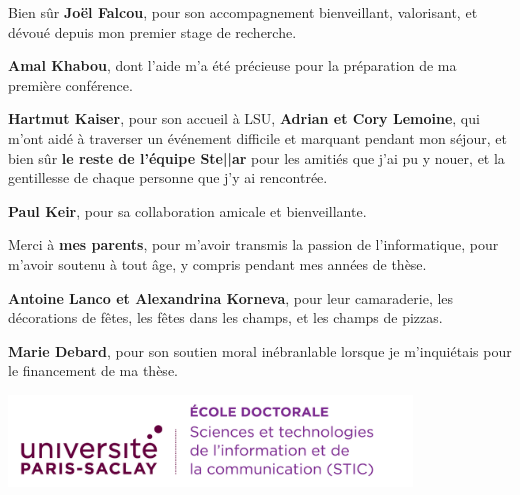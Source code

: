 \documentclass[english,12pt,a4paper]{book}
\begin{document}
Bien s\^ur \textbf{Jo\"el Falcou}, pour son accompagnement bienveillant,
valorisant, et d\'evou\'e depuis mon premier stage de recherche.

\textbf{Amal Khabou}, dont l'aide m'a \'et\'e pr\'ecieuse pour la pr\'eparation
de ma premi\`ere conf\'erence.

\textbf{Hartmut Kaiser}, pour son accueil \`a LSU,
\textbf{Adrian et Cory Lemoine}, qui m'ont aid\'e \`a
traverser un \'ev\'enement difficile et marquant pendant mon s\'ejour,
et bien s\^ur \textbf{le reste de l'\'equipe Ste||ar} pour les amiti\'es
que j'ai pu y nouer, et la gentillesse de chaque personne que j'y ai
rencontr\'ee.

\textbf{Paul Keir}, pour sa collaboration amicale et bienveillante.

Merci \`a \textbf{mes parents},
pour m'avoir transmis la passion de l'informatique,
pour m'avoir soutenu \`a tout \^age,
y compris pendant mes ann\'ees de th\`ese.

\textbf{Antoine Lanco et Alexandrina Korneva}, pour leur camaraderie, les d\'ecorations de
f\^etes, les f\^etes dans les champs, et les champs de pizzas.

\textbf{Marie Debard}, pour son soutien moral in\'ebranlable lorsque
je m'inqui\'etais pour le financement de ma th\`ese.



\thispagestyle{empty}

\noindent
\includegraphics[height=2.45cm]{ups/logo_STIC.png}
\vspace{1cm}

\small
\end{document}
